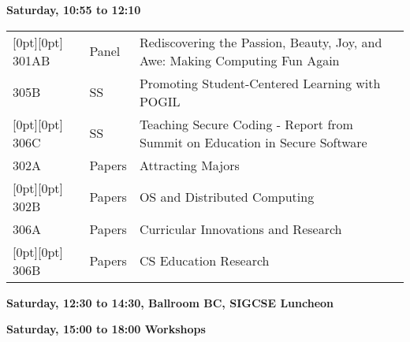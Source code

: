 \noindent
{\sffamily\bfseries Saturday, 10:55 to 12:10}\newline\noindent
\begin{tabular*}{5in}{@{}p{0.5in}@{}p{0.75in}@{}p{3.75in}}

\rowcolor[gray]{0.9}[0pt][0pt] 301AB & Panel & Rediscovering the Passion, Beauty, Joy, and Awe:  Making Computing Fun Again \\

305B & SS & Promoting Student-Centered Learning with POGIL \\

\rowcolor[gray]{0.9}[0pt][0pt] 306C & SS & Teaching Secure Coding - Report from Summit on Education in Secure Software \\

302A & Papers & Attracting Majors \\

\rowcolor[gray]{0.9}[0pt][0pt] 302B & Papers & OS and Distributed Computing \\

306A & Papers & Curricular Innovations and Research \\

\rowcolor[gray]{0.9}[0pt][0pt] 306B & Papers & CS Education Research \\


\end{tabular*}\newline

\noindent
{\sffamily\bfseries Saturday, 12:30 to 14:30, Ballroom BC, SIGCSE Luncheon}\newline
\hspace*{48pt}{\sffamily\bfseries Keynote: Fernanda Viégas and Martin Wattenberg }\newline\noindent

\noindent
{\sffamily\bfseries Saturday, 15:00 to 18:00 Workshops}\newline\noindent

